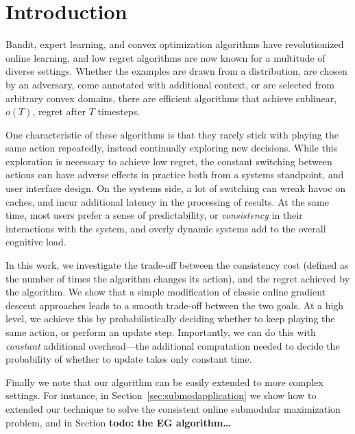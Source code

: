 \chapter{Introduction}
Bandit, expert learning, and convex optimization algorithms have revolutionized online learning, and low regret algorithms are now known for a multitude of diverse settings. Whether the examples are drawn from a distribution, are chosen by an adversary,  come annotated with additional context, or are selected from arbitrary convex domains, there are efficient algorithms that achieve sublinear, $o(T)$, regret after $T$ timesteps. 

One characteristic of these algorithms is that they rarely stick with playing the same action repeatedly, instead continually exploring new decisions. While this exploration is necessary to achieve low regret, the constant switching between actions can have adverse effects in practice both from a systems standpoint, and user interface design.  On the systems side,  a lot of switching can wreak havoc on caches, and incur additional latency in the processing of results.  At the same time, most users prefer a sense of predictability, or {\em consistency} in their interactions with the system, and overly dynamic systems add to the overall cognitive load.  

In this work, we investigate the trade-off between the consistency cost (defined as the number of times the algorithm changes its action), and the regret achieved by the algorithm. We show that a simple modification of classic online gradient descent approaches leads to a smooth trade-off between the two goals. At a high level, we achieve this by probabilistically deciding whether to keep playing the same action, or perform an update step. Importantly, we can do this with \emph{constant} additional overhead---the additional computation needed to decide the probability of whether to update takes only constant time. 

Finally we note that our algorithm can be easily extended to more complex settings. For instance, in Section~\ref{sec:submodapplication} we show how to extended our technique to solve the consistent online submodular maximization problem, and in Section \textbf{todo: the EG algorithm\dots}

